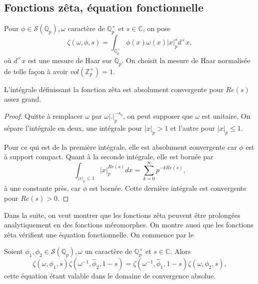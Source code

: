 \subsection{Fonctions zêta, équation fonctionnelle}
\begin{definition}
Pour $\phi \in \mathcal{S}(\mathbb{Q}_p), \omega$ caractère de $\mathbb{Q}_p^\times$ et $s \in \mathbb{C}$, on pose
\begin{equation}
\zeta(\omega,\phi,s) = \int_{\mathbb{Q}_p^\times} \phi(x) \omega(x) |x|_p^s d^\times x,
\end{equation}
où $d^\times x$ est une mesure de Haar sur $\mathbb{Q}_p$. On choisit la mesure de Haar normalisée de telle façon à avoir $vol(\mathbb{Z}_p^\times)=1$.
\end{definition}

\begin{lemme}
\label{convergence-gl1}
L'intégrale définissant la fonction zêta est absolument convergente pour $Re(s)$ assez grand.
\end{lemme}

\begin{proof}
Quitte à remplacer $\omega$ par $\omega|.|_p^{-s_0}$, on peut supposer que $\omega$ est unitaire. On sépare l'intégrale en deux, une intégrale pour $|x|_p > 1$ et l'autre pour $|x|_p \leq 1$. 

Pour ce qui est de la première intégrale, elle est absolument convergente car $\phi$ est à support compact. Quant à la seconde intégrale, elle est bornée par
\begin{equation}
\int_{|x|_p \leq 1} |x|_p^{Re(s)}dx=\sum_{k=0}^{\infty} p^{-kRe(s)},
\end{equation}
à une constante près, car $\phi$ est bornée. Cette dernière intégrale est convergente pour $Re(s) > 0$.
\end{proof}

Dans la suite, on veut montrer que les fonctions zêta peuvent être prolongées analytiquement en des fonctions méromorphes. On montre aussi que les fonctions zêta vérifient une équation fonctionnelle. On commence par le
\begin{lemme}
\label{lemme_fun}
Soient $\phi_1, \phi_2 \in \mathcal{S}(\mathbb{Q}_p), \omega$ un caractère de $\mathbb{Q}_p^\times$ et $s \in \mathbb{C}$. Alors
\begin{equation}
\zeta(\omega, \phi_1, s)\zeta(\omega^{-1}, \hat{\phi}_2, 1-s)=\zeta(\omega^{-1}, \hat{\phi}_1, 1-s)\zeta(\omega, \phi_2, s),
\end{equation}
cette équation étant valable dans le domaine de convergence absolue.
\end{lemme}


